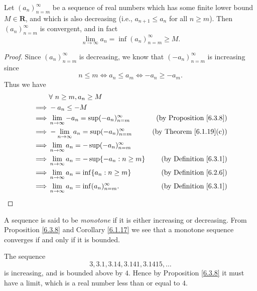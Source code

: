 \begin{additional corollary}\label{ac 6.3.1}
Let \((a_n)_{n = m}^\infty\) be a sequence of real numbers which has some finite lower bound \(M \in \mathbf{R}\), and which is also decreasing (i.e., \(a_{n + 1} \leq a_n\) for all \(n \geq m\)).
Then \((a_n)_{n = m}^\infty\) is convergent, and in fact
\[
    \lim_{n \to \infty} a_n = \inf(a_n)_{n = m}^\infty \geq M.
\]
\end{additional corollary}

\begin{proof}
    Since \((a_n)_{n = m}^\infty\) is decreasing, we know that \((-a_n)_{n = m}^\infty\) is increasing since
    \[
        n \leq m \iff a_n \leq a_m \iff -a_n \geq -a_m.
    \]
    Thus we have
    \begin{align*}
                 & \forall\ n \geq m, a_n \geq M                                                              \\
        \implies & -a_n \leq -M                                                                               \\
        \implies & \lim_{n \to \infty} -a_n = \sup(-a_n)_{n = m}^\infty & \text{(by Proposition \ref{6.3.8})} \\
        \implies & -\lim_{n \to \infty} a_n = \sup(-a_n)_{n = m}^\infty & \text{(by Theorem \ref{6.1.19}(c))} \\
        \implies & \lim_{n \to \infty} a_n = -\sup(-a_n)_{n = m}^\infty                                       \\
        \implies & \lim_{n \to \infty} a_n = -\sup\{-a_n : n \geq m\}   & \text{(by Definition \ref{6.3.1})}  \\
        \implies & \lim_{n \to \infty} a_n = \inf\{a_n : n \geq m\}     & \text{(by Definition \ref{6.2.6})}  \\
        \implies & \lim_{n \to \infty} a_n = \inf(a_n)_{n = m}^\infty.  & \text{(by Definition \ref{6.3.1})}
    \end{align*}
\end{proof}

\begin{note}
    A sequence is said to be \emph{monotone} if it is either increasing or decreasing.
    From Proposition \ref{6.3.8} and Corollary \ref{6.1.17} we see that a monotone sequence converges if and only if it is bounded.
\end{note}

\begin{example}\label{6.3.9}
    The sequence
    \[
        3, 3.1, 3.14, 3.141, 3.1415, \dots
    \]
    is increasing, and is bounded above by \(4\).
    Hence by Proposition \ref{6.3.8} it must have a limit, which is a real number less than or equal to \(4\).
\end{example}

